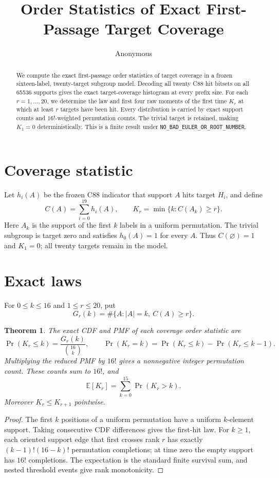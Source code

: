 \documentclass[10pt]{article}
\title{Order Statistics of Exact First-Passage Target Coverage}
\author{Anonymous}
\date{}
\newtheorem{theorem}{Theorem}
\begin{document}
\maketitle
\begin{abstract}
We compute the exact first-passage order statistics of target coverage in a
frozen sixteen-label, twenty-target subgroup model.  Decoding all twenty C88
hit bitsets on all 65536 supports gives the exact target-coverage histogram
at every prefix size.  For each $r=1,\ldots,20$, we determine the law and
first four raw moments of the first time $K_r$ at which at least $r$ targets
have been hit.  Every distribution is carried by exact support counts and
$16!$-weighted permutation counts.  The trivial target is retained, making
$K_1=0$ deterministically.  This is a finite result under
\texttt{NO\_BAD\_EULER\_OR\_ROOT\_NUMBER}.
\end{abstract}

\section{Coverage statistic}
Let $h_i(A)$ be the frozen C88 indicator that support $A$ hits target $H_i$,
and define
\[
 C(A)=\sum_{i=0}^{19}h_i(A),\qquad
 K_r=\min\{k:C(A_k)\geq r\}.
\]
Here $A_k$ is the support of the first $k$ labels in a uniform permutation.
The trivial subgroup is target zero and satisfies $h_0(A)=1$ for every $A$.
Thus $C(\varnothing)=1$ and $K_1=0$; all twenty targets remain in the model.

\section{Exact laws}
For $0\leq k\leq16$ and $1\leq r\leq20$, put
\[
 G_r(k)=\#\{A:|A|=k,\ C(A)\geq r\}.
\]
\begin{theorem}
The exact CDF and PMF of each coverage order statistic are
\[
 \Pr(K_r\leq k)=\frac{G_r(k)}{\binom{16}{k}},\qquad
 \Pr(K_r=k)=\Pr(K_r\leq k)-\Pr(K_r\leq k-1).
\]
Multiplying the reduced PMF by $16!$ gives a nonnegative integer permutation
count.  These counts sum to $16!$, and
\[
 \mathbb E[K_r]=\sum_{k=0}^{15}\Pr(K_r>k).
\]
Moreover $K_r\leq K_{r+1}$ pointwise.
\end{theorem}
\begin{proof}
The first $k$ positions of a uniform permutation have a uniform
$k$-element support.  Taking consecutive CDF differences gives the first-hit
law.  For $k\geq1$, each oriented support edge that first crosses rank $r$
has exactly $(k-1)!(16-k)!$ permutation completions; at time zero the empty
support has $16!$ completions.  The expectation is the standard finite
survival sum, and nested threshold events give rank monotonicity.
\end{proof}
\end{document}
